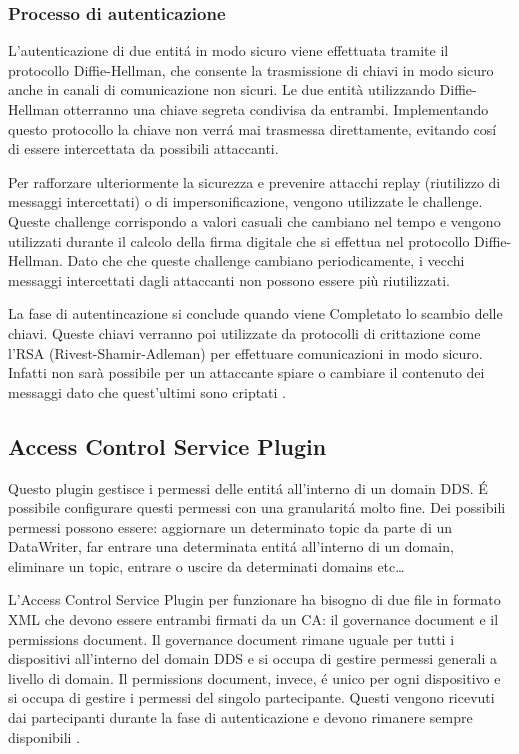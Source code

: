 \subsubsection{Processo di autenticazione}
L'autenticazione di due entitá in modo sicuro viene effettuata
tramite il protocollo Diffie-Hellman, che consente la trasmissione 
di chiavi in modo sicuro anche in canali di comunicazione non sicuri.
Le due entità utilizzando Diffie-Hellman otterranno una chiave 
segreta condivisa da entrambi. Implementando questo 
protocollo la chiave non verrá mai 
trasmessa direttamente, evitando cosí di essere intercettata da 
possibili attaccanti. 

Per rafforzare ulteriormente la sicurezza e prevenire attacchi replay 
(riutilizzo di messaggi intercettati) o di impersonificazione, vengono 
utilizzate le challenge. Queste challenge corrispondo a valori 
casuali che cambiano nel tempo e vengono utilizzati durante il 
calcolo della firma digitale che si effettua nel protocollo
Diffie-Hellman.
Dato che che queste challenge cambiano periodicamente,
i vecchi messaggi intercettati dagli attaccanti non possono essere 
più riutilizzati.

La fase di autentincazione si conclude quando viene Completato
lo scambio delle chiavi.
Queste chiavi verranno poi utilizzate da protocolli di 
crittazione come l'RSA (Rivest-Shamir-Adleman) per effettuare 
comunicazioni in modo sicuro. Infatti non sarà possibile per un 
attaccante spiare o cambiare il contenuto dei messaggi dato 
che quest'ultimi sono criptati 
\cite{DBLP:conf/asiaccs/WangLG24}.


\subsection{Access Control Service Plugin}
Questo plugin gestisce i permessi delle entitá all'interno di 
un domain DDS. É possibile configurare questi permessi con una 
granularitá molto fine. Dei possibili permessi possono essere:
aggiornare un determinato topic da parte di 
un DataWriter, far entrare una determinata entitá
all'interno di un domain, eliminare un topic, entrare o 
uscire da determinati domains etc\dots

L'Access Control Service Plugin per funzionare ha bisogno di due 
file in formato XML che devono essere entrambi firmati da 
un CA: il governance document e il permissions document.
Il governance document rimane uguale per tutti i dispositivi 
all'interno del domain DDS e si occupa di gestire 
permessi generali a livello di domain. Il permissions document,
invece, é unico per ogni dispositivo e si occupa di gestire i 
permessi del singolo partecipante.
Questi vengono ricevuti dai partecipanti durante la fase di
autenticazione e devono rimanere sempre disponibili \cite{essay93639}.




